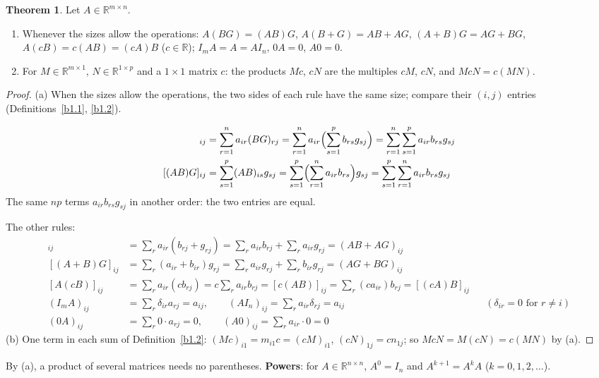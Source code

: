 \documentclass[12pt]{article}
\newcommand{\R}{\mathbb R}
\theoremstyle{definition}
\newtheorem{theorem}{Theorem}
\newcommand{\boardtop}{\vspace*{-\abovedisplayskip}}
\begin{document}
\begin{theorem}\label{b1.3}
Let \(A\in\R^{m\times n}\).
\begin{enumerate}
\item Whenever the sizes allow the operations:
\(A(BG)=(AB)G\), \(A(B+G)=AB+AG\), \((A+B)G=AG+BG\), \(A(cB)=c(AB)=(cA)B\) (\(c\in\R\)); \(I_mA=A=AI_n\), \(0A=0\),
\(A0=0\).
\item For \(M\in\R^{m\times1}\), \(N\in\R^{1\times p}\) and a \(1\times1\) matrix \(c\): the products \(Mc\), \(cN\) are
the multiples \(cM\), \(cN\), and \(McN=c(MN)\).
\end{enumerate}
\end{theorem}
\begin{proof}
(a) When the sizes allow the operations, the two sides of each rule have the same size; compare their \((i,j)\)
entries (Definitions~\ref{b1.1}, \ref{b1.2}).
\begin{board}[\(A(BG)=(AB)G\) for \(B\in\R^{n\times p}\), \(G\in\R^{p\times q}\); both sides are in \(\R^{m\times q}\):]
\boardtop
\begin{align*}
[A(BG)]_{ij}&=\sum_{r=1}^na_{ir}(BG)_{rj}=\sum_{r=1}^na_{ir}\Bigl(\sum_{s=1}^pb_{rs}g_{sj}\Bigr)
=\sum_{r=1}^n\sum_{s=1}^pa_{ir}b_{rs}g_{sj}\\
[(AB)G]_{ij}&=\sum_{s=1}^p(AB)_{is}g_{sj}=\sum_{s=1}^p\Bigl(\sum_{r=1}^na_{ir}b_{rs}\Bigr)g_{sj}
=\sum_{s=1}^p\sum_{r=1}^na_{ir}b_{rs}g_{sj}
\end{align*}
The same \(np\) terms \(a_{ir}b_{rs}g_{sj}\) in another order: the two entries are equal.
\end{board}
The other rules:
\begin{align*}
[A(B+G)]_{ij}&=\textstyle\sum_ra_{ir}(b_{rj}+g_{rj})=\sum_ra_{ir}b_{rj}+\sum_ra_{ir}g_{rj}=(AB+AG)_{ij}\\
[(A+B)G]_{ij}&=\textstyle\sum_r(a_{ir}+b_{ir})g_{rj}=\sum_ra_{ir}g_{rj}+\sum_rb_{ir}g_{rj}=(AG+BG)_{ij}\\
[A(cB)]_{ij}&=\textstyle\sum_ra_{ir}(cb_{rj})=c\sum_ra_{ir}b_{rj}=[c(AB)]_{ij}=\sum_r(ca_{ir})b_{rj}=[(cA)B]_{ij}\\
(I_mA)_{ij}&=\textstyle\sum_r\delta_{ir}a_{rj}=a_{ij},\qquad(AI_n)_{ij}=\sum_ra_{ir}\delta_{rj}=a_{ij}
&&(\delta_{ir}=0\text{ for }r\ne i)\\
(0A)_{ij}&=\textstyle\sum_r0\cdot a_{rj}=0,\qquad(A0)_{ij}=\sum_ra_{ir}\cdot0=0
\end{align*}
(b) One term in each sum of Definition~\ref{b1.2}: \((Mc)_{i1}=m_{i1}c=(cM)_{i1}\), \((cN)_{1j}=cn_{1j}\); so
\(McN=M(cN)=c(MN)\) by (a).
\end{proof}
By (a), a product of several matrices needs no parentheses. \textbf{Powers}: for \(A\in\R^{n\times n}\), \(A^0=I_n\) and
\(A^{k+1}=A^kA\) (\(k=0,1,2,\dots\)).
\end{document}
